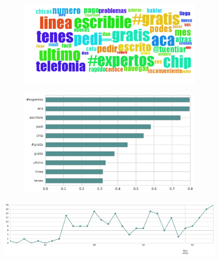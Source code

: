 \begin{figure}[htbp!]
    \centering
    \begin{subfigure}[b]{0.49\textwidth}
        \includegraphics[width=\textwidth]{twitter_all/report_images/topic-14-wordcloud.jpg}
    \end{subfigure}
    \begin{subfigure}[b]{0.49\textwidth}
        \includegraphics[width=\textwidth]{twitter_all/report_images/topic-14-terms.jpg}
    \end{subfigure}
\end{figure}

\begin{figure}[htbp!]
    \centering
    \includegraphics[width=\textwidth]{twitter_all/report_images/topic-14-timeseries.jpg}
\end{figure}

